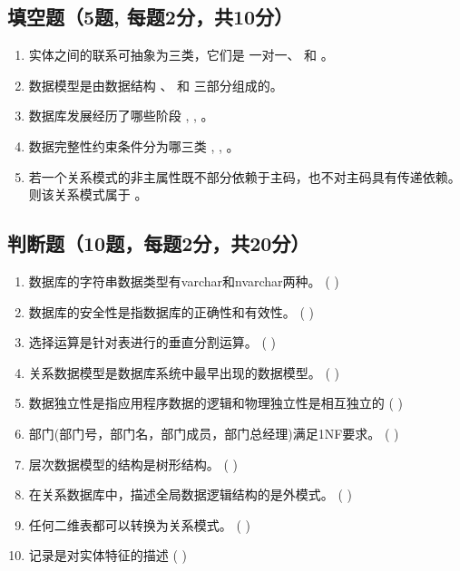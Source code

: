 \documentclass{article}
\begin{document}
\subsection{填空题（5题, 每题2分，共10分）}
\begin{enumerate}
\item 实体之间的联系可抽象为三类，它们是 一对一、 和 。

\item 数据模型是由数据结构 、 和 三部分组成的。

\item 数据库发展经历了哪些阶段 , , 。

\item 数据完整性约束条件分为哪三类 , , 。

\item 若一个关系模式的非主属性既不部分依赖于主码，也不对主码具有传递依赖。则该关系模式属于 。
\end{enumerate}

\subsection{判断题（10题，每题2分，共20分）}
\begin{enumerate}
\item 数据库的字符串数据类型有varchar和nvarchar两种。 ( )

\item 数据库的安全性是指数据库的正确性和有效性。 ( )

\item 选择运算是针对表进行的垂直分割运算。 ( )

\item 关系数据模型是数据库系统中最早出现的数据模型。 ( )

\item 数据独立性是指应用程序数据的逻辑和物理独立性是相互独立的 ( )

\item 部门(部门号，部门名，部门成员，部门总经理)满足1NF要求。 ( )

\item 层次数据模型的结构是树形结构。 ( )

\item 在关系数据库中，描述全局数据逻辑结构的是外模式。 ( )

\item 任何二维表都可以转换为关系模式。 ( )

\item 记录是对实体特征的描述 ( )
\end{enumerate}
\end{document}
